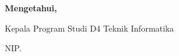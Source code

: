 \vspace{2cm}

\begin{center}{\FontPengesahanIsi\bfseries Mengetahui,}\end{center}
\vspace{0.2cm}

\begin{center}
  {\FontPengesahanIsi Kepala Program Studi D4 Teknik Informatika\par}
  \vspace{1.6cm}
  {\bfseries\FontPengesahanIsi \underline{\NamaKetuaProdi}}\par
  \vspace{0.15cm}
  {\FontPengesahanIsi NIP. \NIPKetuaProdi\par}
\end{center}
\thispagestyle{empty} %
